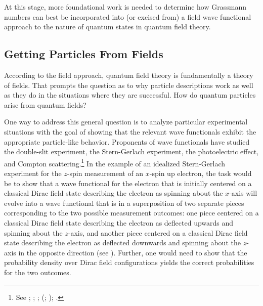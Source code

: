 \documentclass[12pt,onecolumn,secnumarabic,amsmath,amssymb,balancelastpage,nofootinbib]{article}
\begin{document}
At this stage, more foundational work is needed to determine how Grassmann numbers can best be incorporated into (or excised from) a field wave functional approach to the nature of quantum states in quantum field theory.


\subsection{Getting Particles From Fields}

According to the field approach, quantum field theory is fundamentally a theory of fields.  That prompts the question as to why particle descriptions work as well as they do in the situations where they are successful.  How do quantum particles arise from quantum fields?


One way to address this general question is to analyze particular experimental situations with the goal of showing that the relevant wave functionals exhibit the appropriate particle-like behavior.  Proponents of wave functionals have studied the double-slit experiment, the Stern-Gerlach experiment, the photoelectric effect, and Compton scattering.\footnote{See \citet[pg.\ 363--373]{bohm1987}; \citet[ch.\ 11]{bohmhiley}; \citet[sec.\ 4]{kaloyerou1994}; \citeauthor{valentini1992} (\citeyear[sec.\ 4.1]{valentini1992}; \citeyear[pg.\ 54--55]{valentini1996}); \citet{spinmeasurement}.}  In the example of an idealized Stern-Gerlach experiment for the $z$-spin measurement of an $x$-spin up electron, the task would be to show that a wave functional for the electron that is initially centered on a classical Dirac field state describing the electron as spinning about the $x$-axis will evolve into a wave functional that is in a superposition of two separate pieces corresponding to the two possible measurement outcomes: one piece centered on a classical Dirac field state describing the electron as deflected upwards and spinning about the $z$-axis, and another piece centered on a classical Dirac field state describing the electron as deflected downwards and spinning about the $z$-axis in the opposite direction (see \citealp[sec.\ 7]{spinmeasurement}).  Further, one would need to show that the probability density over Dirac field configurations yields the correct probabilities for the two outcomes.
\end{document}
